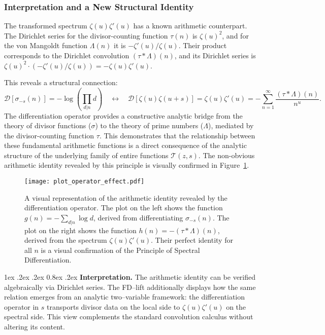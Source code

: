 \documentclass[11pt,a4paper]{amsart}
\makeatletter
\renewcommand\paragraph{\@startsection{paragraph}{4}{\z@}%
  {1ex \@plus .2ex \@minus .2ex}%
  {0.8ex \@plus .2ex}%
  {\normalfont\bfseries}}
\theoremstyle{plain}
\theoremstyle{definition}
\theoremstyle{remark}
\makeatother
\begin{document}
\subsubsection{Interpretation and a New Structural Identity}
The transformed spectrum $\zeta(u)\zeta'(u)$ has a known arithmetic counterpart. The Dirichlet series for the divisor-counting function $\tau(n)$ is $\zeta(u)^2$, and for the von Mangoldt function $\Lambda(n)$ it is $-\zeta'(u)/\zeta(u)$. Their product corresponds to the Dirichlet convolution $(\tau * \Lambda)(n)$, and its Dirichlet series is $\zeta(u)^2 \cdot (-\zeta'(u)/\zeta(u)) = -\zeta(u)\zeta'(u)$.

This reveals a structural connection:
\[
\mathcal{D}[\sigma_{-s}(n)] = -\log\left(\prod_{d|n} d\right) \quad \longleftrightarrow \quad \mathcal{D}[\zeta(u)\zeta(u+s)] = \zeta(u)\zeta'(u) = - \sum_{n=1}^\infty \frac{(\tau * \Lambda)(n)}{n^u}.
\]
The differentiation operator provides a constructive analytic bridge from the theory of divisor functions ($\sigma$) to the theory of prime numbers ($\Lambda$), mediated by the divisor-counting function $\tau$. This demonstrates that the relationship between these fundamental arithmetic functions is a direct consequence of the analytic structure of the underlying family of entire functions $\mathcal{T}(z,s)$. The non-obvious arithmetic identity revealed by this principle is visually confirmed in Figure~\ref{fig:operator_effect}.

\begin{figure}[!htbp]
\centering
\texttt{[image: plot\_operator\_effect.pdf]}
\caption{A visual representation of the arithmetic identity revealed by the differentiation operator. The plot on the left shows the function $g(n) = -\sum_{d|n} \log d$, derived from differentiating $\sigma_{-s}(n)$. The plot on the right shows the function $h(n) = -(\tau * \Lambda)(n)$, derived from the spectrum $\zeta(u)\zeta'(u)$. Their perfect identity for all $n$ is a visual confirmation of the Principle of Spectral Differentiation.}
\label{fig:operator_effect}
\end{figure}

\FloatBarrier

\paragraph{\textbf{Interpretation.}} The arithmetic identity can be verified algebraically via Dirichlet series. The FD--lift additionally displays how the same relation emerges from an analytic two--variable framework: the differentiation operator in $s$ transports divisor data on the local side to $\zeta(u)\zeta'(u)$ on the spectral side. This view complements the standard convolution calculus without altering its content.
\end{document}
